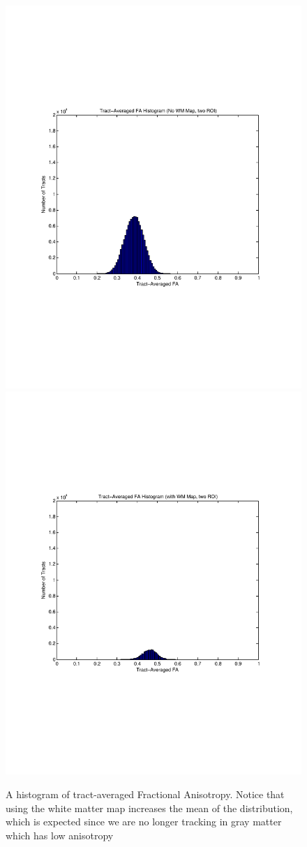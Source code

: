 \begin{figure} \label{fig:twoFAhistograms}
	\includegraphics[trim = 20mm 70mm 20mm 70mm, clip, width=0.5\linewidth]
	  {hist_FA_nomask_two}
	\includegraphics[trim = 20mm 70mm 20mm 70mm, clip, width=0.5\linewidth]
	  {hist_FA_mask_two}
	\caption{A histogram of tract-averaged Fractional Anisotropy.  Notice that using the white matter map increases the mean of the distribution, which is expected since we are no longer tracking in gray matter which has low anisotropy }
\end{figure}

